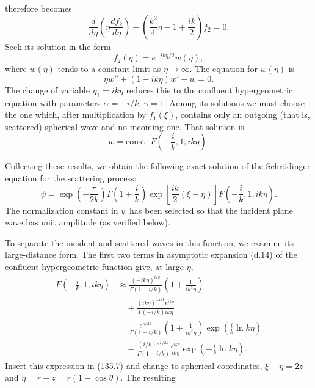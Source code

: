 therefore becomes
\[
 \frac{d}{d\eta}\left(\eta\frac{df_2}{d\eta}\right)
 +\left(\frac{k^2}{4}\eta-1+\frac{ik}{2}\right)f_2=0.
\]
Seek its solution in the form
\begin{equation}
 f_2(\eta)=e^{-ik\eta/2}w(\eta),
 \tag{135.5}
\end{equation}
where $w(\eta)$ tends to a constant limit as $\eta\to\infty$. The equation for
$w(\eta)$ is
\begin{equation}
 \eta w''+(1-ik\eta)w'-w=0.
 \tag{135.6}
\end{equation}
The change of variable $\eta_1=ik\eta$ reduces this to the confluent
hypergeometric equation with parameters $\alpha=-i/k$, $\gamma=1$. Among its
solutions we must choose the one which, after multiplication by $f_1(\xi)$,
contains only an outgoing (that is, scattered) spherical wave and no incoming
one. That solution is
\[
 w=\mathrm{const}\cdot F\left(-\frac{i}{k},1,ik\eta\right).
\]

Collecting these results, we obtain the following exact solution of the
Schr\"odinger equation for the scattering process:
\begin{equation}
 \psi=\exp\left(-\frac{\pi}{2k}\right)\Gamma\left(1+\frac{i}{k}\right)
 \exp\left[\frac{ik}{2}(\xi-\eta)\right]
 F\left(-\frac{i}{k},1,ik\eta\right).
 \tag{135.7}
\end{equation}
The normalization constant in $\psi$ has been selected so that the incident
plane wave has unit amplitude (as verified below).

To separate the incident and scattered waves in this function, we examine its
large-distance form. The first two terms in asymptotic expansion (d.14) of the
confluent hypergeometric function give, at large $\eta$,
\begin{align*}
 F\left(-\frac{i}{k},1,ik\eta\right)
 &\approx\frac{(-ik\eta)^{i/k}}{\Gamma(1+i/k)}
 \left(1+\frac{1}{ik^3\eta}\right)\\
 &\quad+\frac{(ik\eta)^{-i/k}e^{ik\eta}}{\Gamma(-i/k)ik\eta}\\
 &=\frac{e^{\pi/2k}}{\Gamma(1+i/k)}
 \left(1+\frac{1}{ik^3\eta}\right)
 \exp\left(\frac{i}{k}\ln k\eta\right)\\
 &\quad-\frac{(i/k)e^{\pi/2k}}{\Gamma(1-i/k)}
 \frac{e^{ik\eta}}{ik\eta}
 \exp\left(-\frac{i}{k}\ln k\eta\right).
\end{align*}
Insert this expression in (135.7) and change to spherical coordinates,
$\xi-\eta=2z$ and $\eta=r-z=r(1-\cos\theta)$. The resulting

